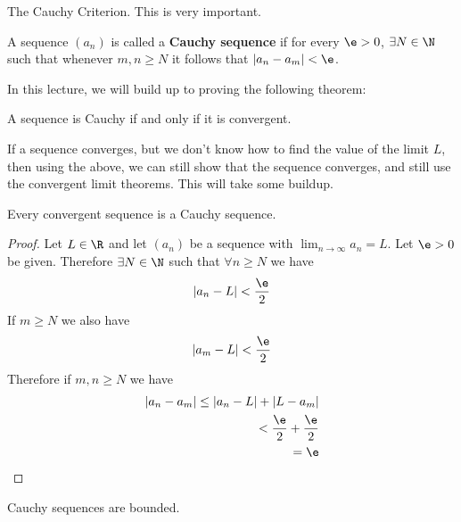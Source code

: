 
The Cauchy Criterion. This is very important.

\begin{definition}
	A sequence $\left( a_n \right) $ is called a \textbf{Cauchy sequence} if for every $\e > 0$, $\exists N \in  \N$ such that whenever $m, n \ge N$ it follows that $\left|a_n - a_m\right| < \e$.
\end{definition}

In this lecture, we will build up to proving the following theorem:
\begin{theorem}
	A sequence is Cauchy if and only if it is convergent.
\end{theorem}

\begin{note}
	If a sequence converges, but we don't know how to find the value of the limit  $L$, then using the above, we can still show that the sequence converges, and still use the convergent limit theorems. This will take some buildup.
\end{note}

\begin{theorem}
	Every convergent sequence is a Cauchy sequence.
\end{theorem}

\begin{proof}
	Let $L \in  \R$ and let $\left( a_n \right) $ be a sequence with $\lim_{n \to \infty } a_n = L$. Let $\e > 0$ be given. Therefore $\exists N \in \N$ such that $\forall n\ge N$ we have 
	\begin{align}
		\left|a_n - L\right| < \frac{\e}{2}
	\end{align}
	If $m \ge N$ we also have
	\begin{align}
		\left|a_m - L \right| < \frac{\e}{2}
	\end{align}
	Therefore if $m,n \ge N$ we have
	\begin{align}
		\left|a_n -a_m\right| \le \left|a_n - L\right| + \left|L - a_m\right| \\
		< \frac{\e}{2} + \frac{\e}{2} \\
		= \e
	\end{align}
\end{proof}

\begin{theorem}
	Cauchy sequences are bounded.
\end{theorem}

